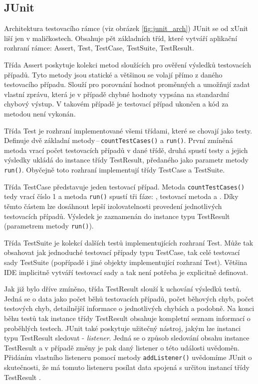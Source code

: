     \subsection{JUnit}
    \label{section:JUnit}
    Architektura testovacího rámce (viz obrázek \ref{fig:junit_arch}) JUnit se od xUnit liší jen v maličkostech. Obsahuje pět základních tříd, které vytváří aplikační rozhraní rámce: Assert, Test, TestCase, TestSuite, TestResult.

    Třída Assert poskytuje kolekci metod sloužících pro ověření výsledků testovacích případů. Tyto metody jsou statické a většinou se volají přímo z daného testovacího případu. Slouží pro porovnání hodnot proměnných a umožňují zadat vlastní zprávu, která je v případě chybné hodnoty vypsána na standardní chybový výstup. V takovém případě je testovací případ ukončen a kód za metodou není vykonán.

    Třída Test je rozhraní implementované všemi třídami, které se chovají jako testy. Definuje dvě základní metody\,--\,\texttt{countTestCases()} a \texttt{run()}. První zmíněná metoda vrací počet testovacích případů v dané třídě, druhá spustí testy a jejich výsledky ukládá do instance třídy TestResult, předaného jako parametr metody \texttt{run()}. Obyčejně toto rozhraní implementují třídy TestCase a TestSuite.

    Třída TestCase představuje jeden testovací případ. Metoda \texttt{countTestCases()} tedy vrací číslo 1 a metoda \texttt{run()} spustí tři fáze: , testovací metoda a . Díky těmto částem lze dosáhnout lepší izolovatelnosti provedení jednotlivých testovacích případů. Výsledek je zaznamenán do instance typu TestResult (parametrem metody \texttt{run()}).

    Třída TestSuite je kolekcí dalších testů implementujících rozhraní Test. Může tak obsahovat jak jednoduché testovací případy typu TestCase, tak celé testovací sady TestSuite (popřípadě i jiné objekty implementující rozhraní Test). Většina IDE implicitně vytváří testovací sady a tak není potřeba je explicitně definovat.

    Jak již bylo dříve zmíněno, třída TestResult slouží k uchování výsledků testů. Jedná se o data jako počet běhů testovacích případů, počet běhových chyb, počet testových chyb, detailnější informace o jednotlivých chybách a podobně. Na konci běhu testů tak instance třídy TestResult obsahuje kompletní seznam informací o proběhlých testech. JUnit také poskytuje užitečný nástroj, jakým lze instanci typu TestResult sledovat - \emph{listener}. Jedná se o způsob sledování obsahu instance TestResult a v případě změny je pak daný listener o této události uvědoměn. Přidáním vlastního listeneru pomocí metody \texttt{addListener()} uvědomíme JUnit o skutečnosti, že má tomuto listeneru posílat data spojená s určitou instancí třídy TestResult \cite{JUnitGuide}.

